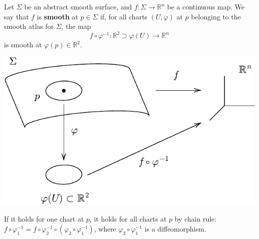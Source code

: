 \documentclass[a4paper]{article}
\begin{document}
\begin{definition}
	Let \( \Sigma \) be an abstract smooth surface, and \( f \colon \Sigma \to \mathbb R^n \) be a continuous map.
	We say that \( f \) is \textbf{smooth} at \( p \in \Sigma \) if, for all charts \( (U, \varphi) \) at \( p \) belonging to the smooth atlas for \( \Sigma \), the map
	\[
		f \circ \varphi^{-1} \colon \mathbb{R}^{2}\supset \varphi(U) \to \mathbb R^n
	\]
	is smooth at \( \varphi(p) \in \mathbb R^2 \).
\end{definition}

\begin{center}
	\includegraphics[scale=0.8]{SmoothFunction}
\end{center}

\begin{note}
	If it holds for one chart at $p$, it holds for all charts at $p$ by chain rule: $ f\circ \varphi_1^{-1} = f\circ \varphi_2^{-1} \circ (\varphi_2\circ \varphi_1^{-1}) $, where $ \varphi_2\circ \varphi_1^{-1} $ is a diffeomorphism. 
\end{note}
\end{document}
